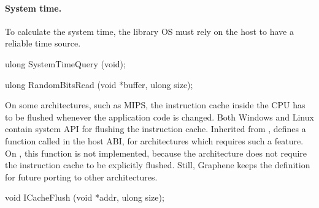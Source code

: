 


\paragraph{System time.} To calculate the system time,
the library OS must rely on the host to have a reliable time source.









\begin{paldef}
ulong SystemTimeQuery (void);
\end{paldef}





\begin{paldef}
ulong RandomBitsRead (void *buffer, ulong size);
\end{paldef}


On some architectures, such as MIPS, the instruction cache inside the CPU 
has to be flushed whenever the application code is changed.
Both Windows and Linux contain system API for flushing the instruction cache.
Inherited from \drawbridge{},
\graphene{} defines a function called  in the host ABI,
for architectures which requires such a feature.
On \graphenearch{}, this function is not implemented,
because the architecture
does not require the instruction cache to be explicitly flushed.
Still, Graphene keeps the definition
for future porting to other architectures.



\begin{paldef}
void ICacheFlush (void *addr, ulong size);
\end{paldef}
